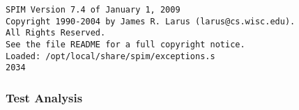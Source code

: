 \begin{verbatim}
SPIM Version 7.4 of January 1, 2009
Copyright 1990-2004 by James R. Larus (larus@cs.wisc.edu).
All Rights Reserved.
See the file README for a full copyright notice.
Loaded: /opt/local/share/spim/exceptions.s
2034
\end{verbatim}\subsubsection{Test Analysis}

